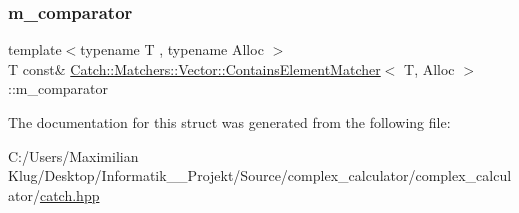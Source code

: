 \subsubsection{\texorpdfstring{m\+\_\+comparator}{m\_comparator}}
{\footnotesize\ttfamily template$<$typename T , typename Alloc $>$ \\
T const\& \mbox{\hyperlink{struct_catch_1_1_matchers_1_1_vector_1_1_contains_element_matcher}{Catch\+::\+Matchers\+::\+Vector\+::\+Contains\+Element\+Matcher}}$<$ T, Alloc $>$\+::m\+\_\+comparator}



The documentation for this struct was generated from the following file\+:\begin{DoxyCompactItemize}
\item 
C\+:/\+Users/\+Maximilian Klug/\+Desktop/\+Informatik\+\_\+\_\+\+Projekt/\+Source/complex\+\_\+calculator/complex\+\_\+calculator/\mbox{\hyperlink{catch_8hpp}{catch.\+hpp}}\end{DoxyCompactItemize}
